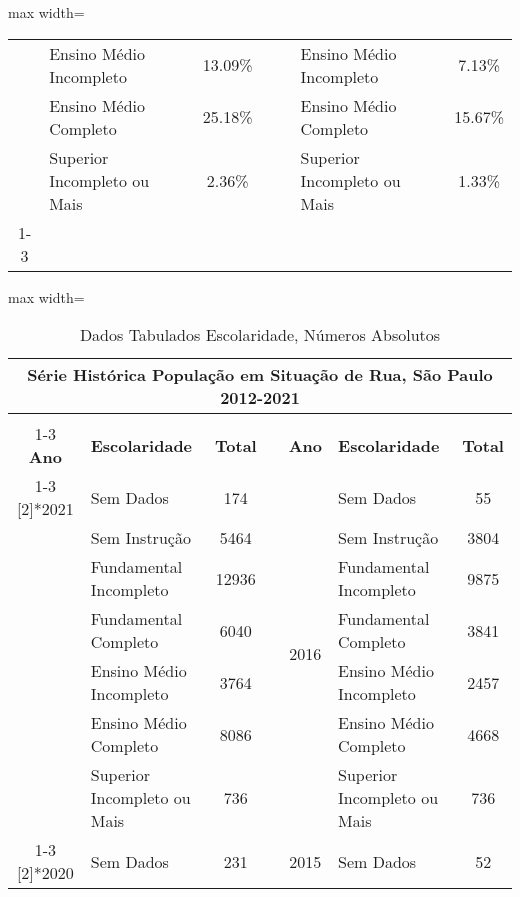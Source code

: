 \documentclass[14pt]{extarticle}
\begin{document}
\begin{table}[htbp]
\begin{adjustbox}{max width=\linewidth}
\begin{tabular}{clccclc}
         & Ensino Médio Incompleto & 13.09\% &      &      & Ensino Médio Incompleto & 7.13\% \\
         & Ensino Médio Completo & 25.18\% &      &      & Ensino Médio Completo & 15.67\% \\
         & Superior Incompleto ou Mais & 2.36\% &      &      & Superior Incompleto ou Mais & 1.33\% \\
\cmidrule{1-3}\cmidrule{5-7}    
\end{tabular}%
\end{adjustbox}
  \label{tab:tab_escolaridade1}%
\end{table}%

\begin{table}[htbp]
  \centering
  \caption{Dados Tabulados Escolaridade, Números Absolutos}
  \tabcolsep=0.15cm
	\renewcommand{\arraystretch}{1.2}
	\begin{adjustbox}{max width=\linewidth}
    \begin{tabular}{clccclc}
    \toprule
    \multicolumn{7}{c}{Série Histórica População em Situação de Rua, São Paulo 2012-2021} \\
    \midrule
         &      &      &      &      &      &  \\
\cmidrule{1-3}\cmidrule{5-7}    \rowcolor[rgb]{ .906,  .902,  .902} \textbf{Ano} & \textbf{Escolaridade} & \textbf{Total} & \cellcolor[rgb]{ 1,  1,  1} & \textbf{Ano} & \textbf{Escolaridade} & \textbf{Total} \\
\cmidrule{1-3}\cmidrule{5-7}    \multirow{7}[2]{*}{2021} & Sem Dados & 174  &      & \multirow{7}[2]{*}{2016} & Sem Dados & 55 \\
         & Sem Instrução & 5464 &      &      & Sem Instrução & 3804 \\
         & Fundamental Incompleto & 12936 &      &      & Fundamental Incompleto & 9875 \\
         & Fundamental Completo & 6040 &      &      & Fundamental Completo & 3841 \\
         & Ensino Médio Incompleto & 3764 &      &      & Ensino Médio Incompleto & 2457 \\
         & Ensino Médio Completo & 8086 &      &      & Ensino Médio Completo & 4668 \\
         & Superior Incompleto ou Mais & 736  &      &      & Superior Incompleto ou Mais & 736 \\
\cmidrule{1-3}\cmidrule{5-7}    \multirow{7}[2]{*}{2020} & Sem Dados & 231  &      & \multirow{7}[2]{*}{2015} & Sem Dados & 52 \\

\end{tabular}
\end{adjustbox}
\end{table}
\end{document}
